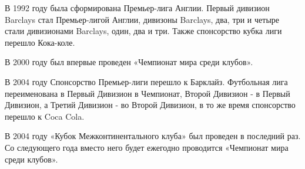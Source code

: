 


В 1992 году была сформирована Премьер-лига Англии. Первый дивизион Barclays стал Премьер-лигой Англии, дивизоны Barclays, два, три и четыре стали дивизионами Barclays, один, два и три. Также спонсорство кубка лиги перешло Кока-коле.






В 2000 году  был впервые проведен «Чемпионат мира среди клубов».




В 2004 году Спонсорство Премьер-лиги перешло к Барклайз. Футбольная лига переименована в Первый Дивизион в Чемпионат, Второй Дивизион - в Первый Дивизион, а Третий Дивизион - во Второй Дивизион, в то же время спонсорство перешло к Coca Cola.

В 2004 году «Кубок Межконтинентального клуба» был проведен в последний раз. Со следующего года вместо него будет ежегодно проводится «Чемпионат мира среди клубов». \cite{fhist}



